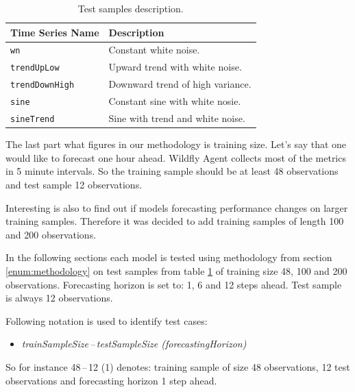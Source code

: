    \begin{table}[h]
        \begin{center}
            \begin{tabular}{l|l}
                \textbf{Time Series Name} &  \textbf{Description} \\ \hline \hline
                \texttt{wn} & Constant white noise. \\
                \texttt{trendUpLow} & Upward trend with white noise. \\
                \texttt{trendDownHigh} & Downward trend of high variance. \\
                \texttt{sine} & Constant sine with white nosie. \\
                \texttt{sineTrend} & Sine with trend and white noise. \\
            \end{tabular}
            \caption{Test samples description.}
            \label{tab:test-samples-description}
        \end{center}
    \end{table}

    The last part what figures in our methodology is training size. Let's say that one would like to forecast one hour
    ahead. Wildfly Agent collects most of the metrics in 5 minute intervals. So the training sample should be at
    least 48 observations and test sample 12 observations.

    Interesting is also to find out if models forecasting performance changes on larger training samples. Therefore it
    was decided to add training samples of length 100 and 200 observations.

    In the following sections each model is tested using methodology from section \ref{enum:methodology} on test
    samples from table \ref{tab:test-samples-description} of training size 48, 100 and 200 observations.
    Forecasting horizon is set to: 1, 6 and 12 steps ahead. Test sample is always 12 observations.

    Following notation is used to identify test cases:
    \begin{itemize}
        \item \emph{trainSampleSize\,--\,testSampleSize (forecastingHorizon)}
    \end{itemize}
    So for instance 48\,--\,12 (1) denotes: training sample of size 48 observations, 12 test observations and
    forecasting horizon 1 step ahead.

